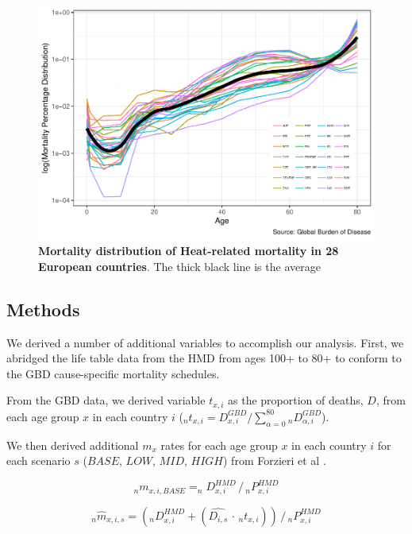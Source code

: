 \documentclass[12pt,]{article}
\makeatletter
\def\maxwidth{\ifdim\Gin@nat@width>\linewidth\linewidth
\else\Gin@nat@width\fi}
\let\Oldincludegraphics\includegraphics
\renewcommand{\includegraphics}[1]{\Oldincludegraphics[width=\maxwidth]{#1}}
\makeatother
\begin{document}
\begin{figure}
\centering
\includegraphics{MS-cclifeexpec_files/figure-latex/suppfig-1.pdf}
\caption{\textbf{Mortality distribution of Heat-related mortality in 28
European countries}. The thick black line is the average\label{suppfig}}
\end{figure}

\hypertarget{methods}{%
\subsection{Methods}\label{methods}}

We derived a number of additional variables to accomplish our analysis.
First, we abridged the life table data from the HMD from ages 100+ to
80+ to conform to the GBD cause-specific mortality schedules.

From the GBD data, we derived variable \(t_{x,i}\) as the proportion of
deaths, \(D\), from each age group \(x\) in each country \(i\)
(\(_nt_{x,i}=D_{x,i}^{GBD}/\sum_{\alpha=0}^{80}{_nD_{\alpha,i}^{GBD}}\)).

We then derived additional \(m_x\) rates for each age group \(x\) in
each country \(i\) for each scenario \(s\) (\(BASE\), \(LOW\), \(MID\),
\(HIGH\)) from Forzieri et al \citep{forzieri2017increasing}.

\begin{equation}
_nm_{x,i,BASE} = _nD_{x,i}^{HMD} \,/\, _nP_{x,i}^{HMD}
\end{equation}

\begin{equation}
_n\hat{m}_{x,i,s} = (_nD_{x,i}^{HMD} + (\hat{D_{i,s}} \,\cdot\, _nt_{x,i}) ) \,/\, _nP_{x,i}^{HMD}
\end{equation}
\end{document}
